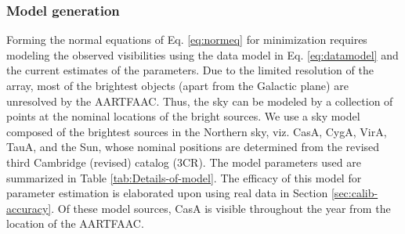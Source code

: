 \documentclass{aa}
\begin{document}
\subsubsection{\label{sub:Model-generation}Model generation}
\begin{table}[tbh]
\caption{Details of model sources (the A-team) used for all-sky self-calibration.}
\label{tab:Details-of-model}
\end{table}

Forming the  normal equations of  Eq. \ref{eq:normeq} for  minimization requires
modeling    the    observed   visibilities    using    the    data   model    in
Eq. \ref{eq:datamodel} and the current  estimates of the parameters.  Due to the
limited resolution of  the array, most of the brightest  objects (apart from the
Galactic plane) are unresolved by the AARTFAAC.  Thus, the sky can be modeled by
a collection of points at the nominal  locations of the bright sources. We use a
sky model  composed of the  brightest sources in  the Northern sky,  viz.  CasA,
CygA, VirA,  TauA, and the Sun,  whose nominal positions are  determined from the
revised third Cambridge (revised) catalog  (3CR).  The model parameters used are
summarized in Table \ref{tab:Details-of-model}.   The efficacy of this model for
parameter   estimation  is   elaborated  upon   using  real   data   in  Section
\ref{sec:calib-accuracy}.  Of  these model  sources, CasA is  visible throughout
the year from the location of the AARTFAAC.
\end{document}
